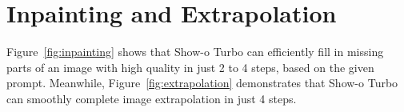 \clearpage
\setcounter{page}{1}
\maketitlesupplementary
\appendix
\renewcommand{\thesection}{\Alph{section}}











\section{Inpainting and Extrapolation}
\label{sec:Inpainting}

Figure~\ref{fig:inpainting} shows that Show-o Turbo can efficiently fill in missing parts of an image with high quality in just 2 to 4 steps, based on the given prompt. Meanwhile, Figure~\ref{fig:extrapolation} demonstrates that Show-o Turbo can smoothly complete image extrapolation in just 4 steps.


